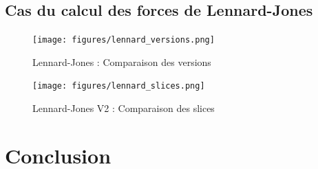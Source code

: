 \documentclass{article}
\begin{document}
\subsection{Cas du calcul des forces de Lennard-Jones}

\begin{figure}[ht]
	\caption{Lennard-Jones : Comparaison des versions}
	\label{lennard-versions}
	\texttt{[image: figures/lennard\_versions.png]}
\end{figure}


\begin{figure}[ht]
	\caption{Lennard-Jones V2 : Comparaison des slices}
	\label{lennard-slices}
	\texttt{[image: figures/lennard\_slices.png]}
\end{figure}
\section{Conclusion}
\end{document}
